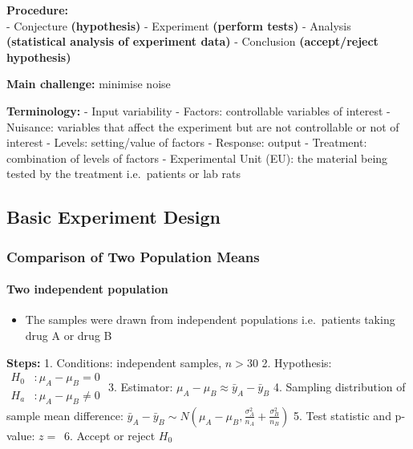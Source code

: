 \documentclass[11pt]{article}
\providecommand{\tightlist}{%
      \setlength{\itemsep}{0pt}\setlength{\parskip}{0pt}}
\begin{document}
\textbf{Procedure:}\\
- Conjecture \textbf{(hypothesis)} - Experiment \textbf{(perform tests)}
- Analysis \textbf{(statistical analysis of experiment data)} -
Conclusion \textbf{(accept/reject hypothesis)}

\textbf{Main challenge:} minimise noise

\textbf{Terminology:} - Input variability - Factors: controllable
variables of interest - Nuisance: variables that affect the experiment
but are not controllable or not of interest - Levels: setting/value of
factors - Response: output - Treatment: combination of levels of factors
- Experimental Unit (EU): the material being tested by the treatment
i.e.~patients or lab rats

\hypertarget{basic-experiment-design}{%
\subsection{Basic Experiment Design}\label{basic-experiment-design}}

\hypertarget{comparison-of-two-population-means}{%
\subsubsection{Comparison of Two Population
Means}\label{comparison-of-two-population-means}}

\hypertarget{two-independent-population}{%
\paragraph{Two independent
population}\label{two-independent-population}}

\begin{itemize}
\tightlist
\item
  The samples were drawn from independent populations i.e.~patients
  taking drug A or drug B
\end{itemize}

\textbf{Steps:} 1. Conditions: independent samples, \(n > 30\) 2.
Hypothesis:
\(\begin{aligned}H_0&:\mu_A-\mu_B=0\\H_a&:\mu_A-\mu_B\neq0\end{aligned}\)
3. Estimator: \(\mu_A-\mu_B\approx\bar y_A -\bar y_B\) 4. Sampling
distribution of sample mean difference:
\(\bar y_A -\bar y_B\sim N\left(\mu_A-\mu_B, \frac{\sigma_A^2}{n_A}+\frac{\sigma_B^2}{n_B}\right)\)
5. Test statistic and p-value: \(z=\frac{}{}\) 6. Accept or reject
\(H_0\)
\end{document}
